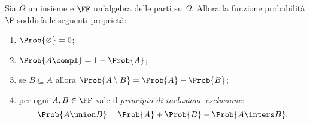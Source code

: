 
\begin{proposition}
    \label{prop:prop_probabil}
    Sia $\Omega$ un insieme e $\FF$ un'algebra delle parti su $\Omega$. Allora la funzione probabilità $\P$ soddisfa le seguenti proprietà:
    \begin{enumerate}
        \item $\Prob{\varnothing} = 0$;
        \item $\Prob{A\compl} = 1 - \Prob{A}$;
        \item se $B \subseteq A$ allora $\Prob{A \setminus B} = \Prob{A} - \Prob{B}$;
        \item per ogni $A, B \in \FF$ vale il \emph{principio di inclusione-esclusione}: \[
            \Prob{A \union B} = \Prob{A} + \Prob{B} - \Prob{A \inters B}.    
        \]
    \end{enumerate}
\end{proposition}
